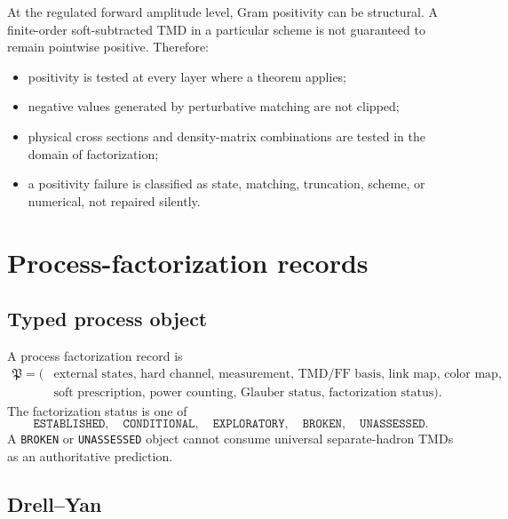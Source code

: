 \documentclass[11pt]{article}
\begin{document}
At the regulated forward amplitude level, Gram positivity can be structural.
A finite-order soft-subtracted TMD in a particular scheme is not guaranteed to
remain pointwise positive.  Therefore:
\begin{itemize}
\item positivity is tested at every layer where a theorem applies;
\item negative values generated by perturbative matching are not clipped;
\item physical cross sections and density-matrix combinations are tested in
      the domain of factorization;
\item a positivity failure is classified as state, matching, truncation,
      scheme, or numerical, not repaired silently.
\end{itemize}

\section{Process-factorization records}
\label{sec:process-records}

\subsection{Typed process object}

A process factorization record is
\begin{equation}
 \begin{aligned}
 \mathfrak P=\bigl(&
 \text{external states},\,
 \text{hard channel},\,
 \text{measurement},\,
 \text{TMD/FF basis},\,
 \text{link map},\,
 \text{color map},\\
 &\text{soft prescription},\,
 \text{power counting},\,
 \text{Glauber status},\,
 \text{factorization status}
 \bigr).
 \end{aligned}
 \label{eq:process-record}
\end{equation}
The factorization status is one of
\begin{equation}
 \texttt{ESTABLISHED},\quad
 \texttt{CONDITIONAL},\quad
 \texttt{EXPLORATORY},\quad
 \texttt{BROKEN},\quad
 \texttt{UNASSESSED}.
 \label{eq:factorization-statuses}
\end{equation}
A \texttt{BROKEN} or \texttt{UNASSESSED} object cannot consume universal
separate-hadron TMDs as an authoritative prediction.

\subsection{Drell--Yan}
\end{document}
